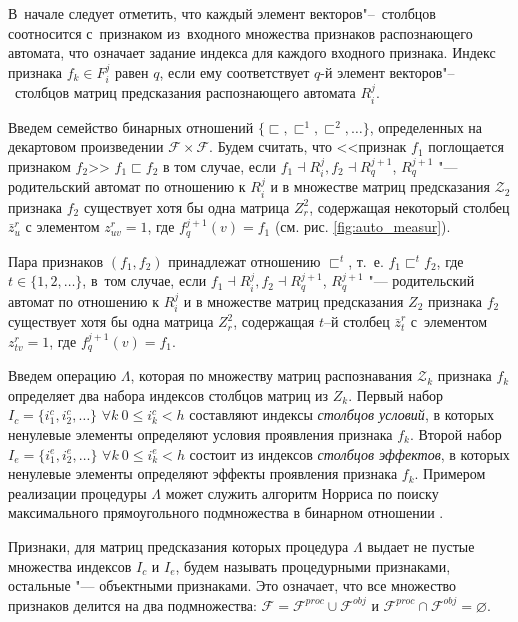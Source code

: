\documentclass[a4paper, 12pt]{article}
\numberwithin{equation}{section}
\begin{document}
	В~начале следует отметить, что каждый элемент векторов"--~столбцов соотносится с~признаком из~входного множества признаков распознающего автомата, что означает задание индекса для каждого входного признака. Индекс признака $f_k\in F_i^j$ равен  $q$, если ему соответствует $q$-й элемент векторов"--~столбцов матриц предсказания распознающего автомата $R_i^j$. 
	
	Введем семейство бинарных отношений $\{\sqsubset,\sqsubset^1,\sqsubset^2,\dots\}$, определенных на декартовом произведении $\mathcal F\times \mathcal F$. Будем считать, что <<признак $f_1$ поглощается признаком $f_2$>> $f_1\sqsubset f_2$ в том случае, если $f_1\dashv R_i^j, f_2\dashv R_q^{j+1}$, $R_q^{j+1}$ "--- родительский автомат по отношению к $R_i^j$ и в множестве матриц предсказания $\mathcal Z_2$ признака $f_2$ существует хотя бы одна матрица $Z_r^2$, содержащая некоторый столбец $\bar z_u^r$ с элементом $z_{uv}^r=1$, где $f_q^{j+1}(v)=f_1$ (см. рис. \ref{fig:auto_measur}).
		
	Пара признаков $(f_1,f_2)$ принадлежат отношению $\sqsubset^t$, т.~е. $f_1\sqsubset^t f_2$, где $t\in\{1,2,\dots\}$, в~том случае, если $f_1\dashv R_i^j, f_2\dashv R_q^{j+1}$, $R_q^{j+1}$ "--- родительский автомат по отношению к $R_i^j$ и в множестве матриц предсказания $Z_2$ признака $f_2$ существует хотя бы одна матрица $Z_r^2$, содержащая $t$–й столбец $\bar z_t^r$ с~элементом $z_{tv}^r=1$, где $f_q^{j+1}(v)=f_1$.	
	
	Введем операцию $\Lambda$, которая по множеству матриц распознавания $\mathcal Z_k$ признака $f_k$ определяет два набора индексов столбцов матриц из $Z_k$. Первый набор $I_c=\{i_1^c,i_2^c,\dots\}$ $\forall k\ 0\leqslant i_k^c < h$ составляют индексы \textit{столбцов условий}, в которых ненулевые элементы определяют условия проявления признака $f_k$. Второй набор $I_e=\{i_1^e,i_2^e,\dots\}$ $\forall k\ 0\leqslant i_k^e < h$ состоит из индексов  \textit{столбцов эффектов}, в которых ненулевые элементы определяют эффекты проявления признака $f_k$. Примером реализации процедуры $\Lambda$ может служить алгоритм Норриса по поиску максимального прямоугольного подмножества в бинарном отношении \cite{Norris1977}.
	
	Признаки, для матриц предсказания которых процедура $\Lambda$ выдает не пустые множества индексов $I_c$ и $I_e$, будем называть процедурными признаками, остальные "--- объектными признаками. Это означает, что все множество признаков делится на два подмножества: $\mathcal F=\mathcal F^{proc}\cup\mathcal F^{obj}$ и $\mathcal F^{proc}\cap\mathcal F^{obj}=\varnothing$.	
\end{document}
